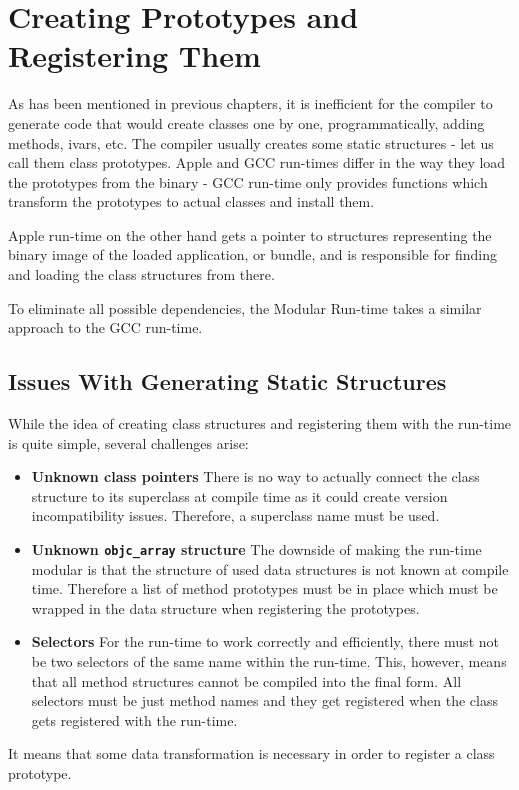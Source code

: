 \section{Creating Prototypes and Registering Them}

As has been mentioned in previous chapters, it is inefficient for the compiler to generate code that would create classes one by one, programmatically, adding methods, ivars, etc. The compiler usually creates some static structures - let us call them class prototypes. Apple and GCC run-times differ in the way they load the prototypes from the binary - GCC run-time only provides functions which transform the prototypes to actual classes and install them.

Apple run-time on the other hand gets a pointer to structures representing the binary image of the loaded application, or bundle, and is responsible for finding and loading the class structures from there.

To eliminate all possible dependencies, the Modular Run-time takes a similar approach to the GCC run-time.

\subsection{Issues With Generating Static Structures}

While the idea of creating class structures and registering them with the run-time is quite simple, several challenges arise:

\begin{itemize}
  \item{\bf{Unknown class pointers}} There is no way to actually connect the class structure to its superclass at compile time as it could create version incompatibility issues. Therefore, a superclass name must be used.
  \item{\bf{Unknown \verb=objc_array= structure}} The downside of making the run-time modular is that the structure of used data structures is not known at compile time. Therefore a list of method prototypes must be in place which must be wrapped in the data structure when registering the prototypes.
  \item{\bf{Selectors}} For the run-time to work correctly and efficiently, there must not be two selectors of the same name within the run-time. This, however, means that all method structures cannot be compiled into the final form. All selectors must be just method names and they get registered when the class gets registered with the run-time.
\end{itemize}

It means that some data transformation is necessary in order to register a class prototype.
